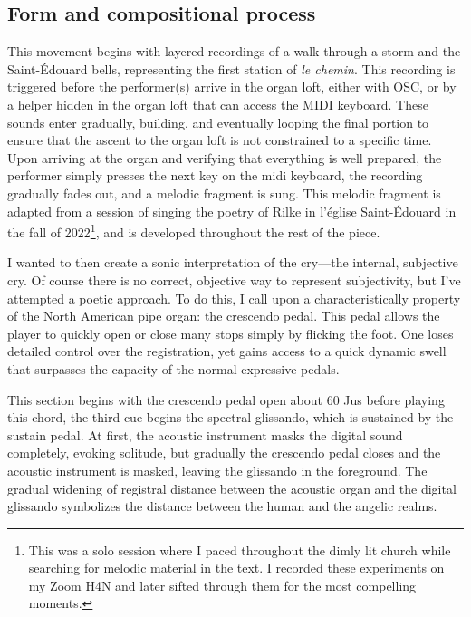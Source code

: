 \documentclass[12pt,twoside,maitrise]{dms_ks}
\theoremstyle{definition}
\begin{document}
{\subsection{Form and compositional process}

This movement begins with layered recordings of a walk through a storm and the Saint-Édouard bells, representing the first station of \textit{le chemin}.
This recording is triggered before the performer(s) arrive in the organ loft, either with OSC, or by a helper hidden in the organ loft that can access the MIDI keyboard.  
These sounds enter gradually, building, and eventually looping the final portion to ensure that the ascent to the organ loft is not constrained to a specific time. 
Upon arriving at the organ and verifying that everything is well prepared, the performer simply presses the next key on the midi keyboard, the recording gradually fades out, and a melodic fragment is sung.
This melodic fragment is adapted from a session of singing the poetry of Rilke in l'église Saint-Édouard in the fall of 2022\footnote{This was a solo session where I paced throughout the dimly lit church while searching for melodic material in the text. I recorded these experiments on my Zoom H4N and later sifted through them for the most compelling moments.}, and is developed throughout the rest of the piece.



I wanted to then create a sonic interpretation of the cry---the internal, subjective cry.
Of course there is no correct, objective way to represent subjectivity, but I've attempted a poetic approach.
To do this, I call upon a characteristically property of the North American pipe organ: the crescendo pedal.
This pedal allows the player to quickly open or close many stops simply by flicking the foot.
One loses detailed control over the registration, yet gains access to a quick dynamic swell that surpasses the capacity of the normal expressive pedals.

This section begins with the crescendo pedal open about 60%
Jus before playing this chord, the third cue begins the spectral glissando, which is sustained by the sustain pedal.
At first, the acoustic instrument masks the digital sound completely, evoking solitude, but gradually the crescendo pedal closes and the acoustic instrument is masked, leaving the glissando in the foreground.
The gradual widening of registral distance between the acoustic organ and the digital glissando symbolizes the distance between the human and the angelic realms.

}
\end{document}
